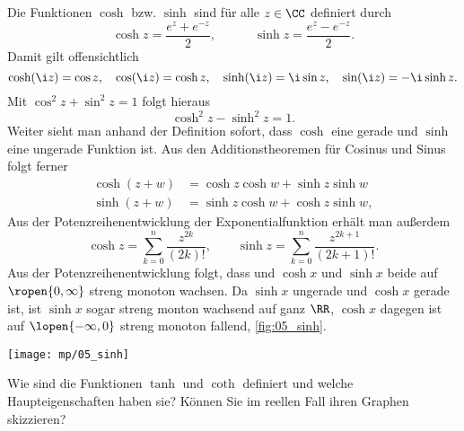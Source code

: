 \begin{antwort}
  Die Funktionen $\cosh$ bzw. $\sinh$ sind für alle $z\in\CC$ definiert durch
  \[
  \boxed{
    \cosh z= \frac{e^z + e^{-z}}{2}, \quad\qquad \sinh z= \frac{e^{z}-e^{-z}}{2}.
  }
  \]
  Damit gilt offensichtlich
  \[
  \cosh(\i z)=\cos z, \quad 
  \cos (\i z)=\cosh z, \quad
  \sinh(\i z)=\i\sin z, \quad
  \sin(\i z)= -\i\sinh z.
  \]
  Mit $\cos^2 z+\sin^2 z=1$ folgt hieraus
  \[
  \boxed{\cosh^2 z - \sinh^2 z = 1.}
  \]
  Weiter sieht man anhand der Definition sofort, dass
  $\cosh$ eine gerade und $\sinh$ eine ungerade Funktion ist. 
  Aus den Additionstheoremen für Cosinus und Sinus folgt ferner
  \begin{align*}
    \cosh( z+w ) &= \cosh z\cosh w+\sinh z\sinh w \\
    \sinh( z+w ) &= \sinh z\cosh w+\cosh z\sinh w,
  \end{align*}
  Aus der Potenzreihenentwicklung der Exponentialfunktion 
  erhält man außerdem 
  \[
  \cosh z = \sum_{k=0}^n \frac{z^{2k}}{(2k)!}, \qquad
  \sinh z = \sum_{k=0}^n \frac{z^{2k+1}}{(2k+1)!}.
  \]
  Aus der Potenzreihenentwicklung folgt, dass und $\cosh x$ 
  und $\sinh x$ beide auf $\ropen{0,\infty}$ streng monoton wachsen. 
  Da $\sinh x$ ungerade und $\cosh x$ gerade ist, 
  ist $\sinh x$ sogar streng monton wachsend 
  auf ganz $\RR$, 
  $\cosh x$ dagegen ist auf $\lopen{-\infty,0}$ streng monoton fallend, 
  \sieheAbbildung\ref{fig:05_sinh}.
  \AntEnd

  \begin{center}
    \texttt{[image: mp/05\_sinh]}
    \label{fig:05_sinh}
  \end{center}

\end{antwort}

\begin{frage}
  Wie sind die Funktionen $\tanh$ und $\coth$ definiert und welche 
  Haupteigenschaften haben sie? Können Sie im reellen Fall ihren 
  Graphen skizzieren?
\end{frage}


